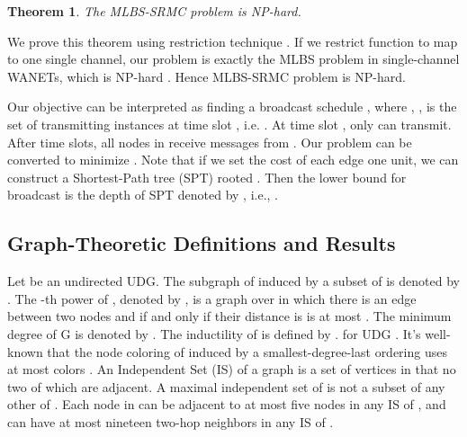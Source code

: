 \documentclass[10pt, conference]{IEEEtran}
\newtheorem{theorem}{Theorem}
\begin{document}
\begin{theorem}
The MLBS-SRMC problem is NP-hard.
\end{theorem}
\begin{IEEEproof}
We prove this theorem using restriction technique \cite{NPC}.
If we restrict function  to map to one single
channel, our problem is exactly the MLBS problem in
single-channel WANETs, which is NP-hard \cite{UDG}.
Hence MLBS-SRMC problem is NP-hard.
\end{IEEEproof}

Our objective can be interpreted as finding a broadcast
schedule , where , , is the set of transmitting instances at time slot , i.e.
. At time slot
, only  can transmit. After  time slots, all nodes in
 receive messages from . Our problem can be converted to
minimize . Note that if we set the cost of each edge one
unit, we can construct a Shortest-Path tree (SPT) rooted .
Then the lower bound for broadcast is the depth of SPT denoted
by , i.e., .

\subsection{Graph-Theoretic Definitions and Results}
Let  be an undirected UDG. The subgraph of  induced
by a subset  of  is denoted by . The -th power
of , denoted by , is a graph over  in which there is
an edge between two nodes  and  if and only if their
distance is  is at most . The minimum degree of G is
denoted by . The inductility of  is defined by
.
 for UDG \cite{info07}. It's well-known
that the node coloring of  induced by a smallest-degree-last
ordering uses at most  colors
\cite{smallest-degree}. An Independent Set (IS) of a graph 
is a set of vertices in  that no two of which are adjacent. A
maximal independent set of  is not a subset of any other
 of . Each node in  can be adjacent to at most five
nodes in any IS of \cite{info07}, and can have at most
nineteen two-hop neighbors in any IS of  \cite{info09}.
\end{document}
